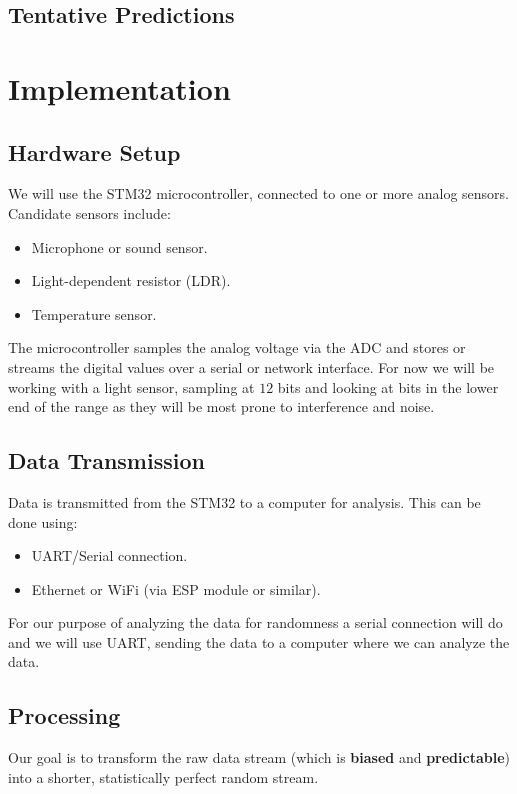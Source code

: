 \subsection{Tentative Predictions}

\newpage
\section{Implementation}
\subsection{Hardware Setup}
We will use the STM32 microcontroller, connected to one or more analog 
sensors. Candidate sensors include:
\begin{itemize}
    \item Microphone or sound sensor.
    \item Light-dependent resistor (LDR).
    \item Temperature sensor.
\end{itemize}

The microcontroller samples the analog voltage via the ADC and 
stores or 
streams the digital values over a serial or network interface.
For now we will be working with a light sensor, sampling 
at $12$ bits and looking at bits in the lower end of the 
range as they will be most prone to interference and noise.

\subsection{Data Transmission}
Data is transmitted from the STM32 to a computer for analysis. 
This can be done using:
\begin{itemize}
    \item UART/Serial connection.
    \item Ethernet or WiFi (via ESP module or similar).
\end{itemize}

For our purpose of analyzing the data for randomness a serial 
connection will do and we will use UART, sending the data 
to a computer where we can analyze the data.

\subsection{Processing}
Our goal is to transform the raw data stream 
(which is \textbf{biased} and \textbf{predictable}) into a shorter, 
statistically perfect random stream.

